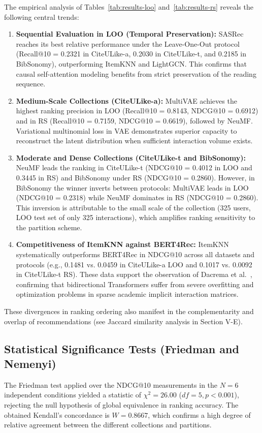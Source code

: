 \documentclass[journal]{IEEEtran}
\makeatletter
\newcommand{\at}[1]{@#1}
\makeatother
\begin{document}
The empirical analysis of Tables~\ref{tab:results-loo} and~\ref{tab:results-rs} reveals the following central trends:
\begin{enumerate}
    \item \textbf{Sequential Evaluation in LOO (Temporal Preservation):} SASRec reaches its best relative performance under the Leave-One-Out protocol (Recall\at{10} = 0.2321 in CiteULike-a, 0.2030 in CiteULike-t, and 0.2185 in BibSonomy), outperforming ItemKNN and LightGCN. This confirms that causal self-attention modeling benefits from strict preservation of the reading sequence.
    \item \textbf{Medium-Scale Collections (CiteULike-a):} MultiVAE achieves the highest ranking precision in LOO (Recall\at{10} = 0.8143, NDCG\at{10} = 0.6912) and in RS (Recall\at{10} = 0.7159, NDCG\at{10} = 0.6619), followed by NeuMF. Variational multinomial loss in VAE demonstrates superior capacity to reconstruct the latent distribution when sufficient interaction volume exists.
    \item \textbf{Moderate and Dense Collections (CiteULike-t and BibSonomy):} NeuMF leads the ranking in CiteULike-t (NDCG\at{10} = 0.4012 in LOO and 0.3445 in RS) and BibSonomy under RS (NDCG\at{10} = 0.2860). However, in BibSonomy the winner inverts between protocols: MultiVAE leads in LOO (NDCG\at{10} = 0.2318) while NeuMF dominates in RS (NDCG\at{10} = 0.2860). This inversion is attributable to the small scale of the collection (325 users, LOO test set of only 325 interactions), which amplifies ranking sensitivity to the partition scheme.
    \item \textbf{Competitiveness of ItemKNN against BERT4Rec:} ItemKNN systematically outperforms BERT4Rec in NDCG\at{10} across all datasets and protocols (e.g., 0.1481 vs. 0.0459 in CiteULike-a LOO and 0.1017 vs. 0.0092 in CiteULike-t RS). These data support the observation of Dacrema et al.~\cite{dacrema2019really}, confirming that bidirectional Transformers suffer from severe overfitting and optimization problems in sparse academic implicit interaction matrices.
\end{enumerate}

These divergences in ranking ordering also manifest in the complementarity and overlap of recommendations (see Jaccard similarity analysis in Section V-E).

\subsection{Statistical Significance Tests (Friedman and Nemenyi)}
The Friedman test applied over the NDCG\at{10} measurements in the $N=6$ independent conditions yielded a statistic of $\chi^2 = 26.00$ ($df = 5, p < 0.001$), rejecting the null hypothesis of global equivalence in ranking accuracy. The obtained Kendall's concordance is $W = 0.8667$, which confirms a high degree of relative agreement between the different collections and partitions.
\end{document}
